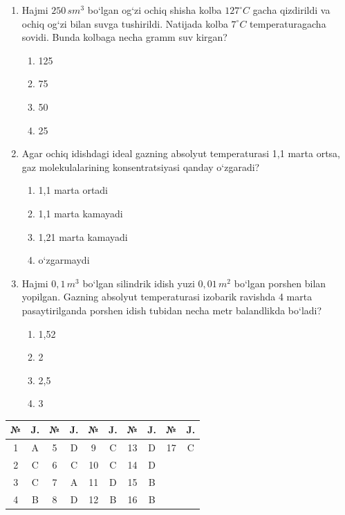 \begin{enumerate}
\item Hajmi $250 \, sm^3$ bo‘lgan og‘zi ochiq shisha kolba $127^\circ C$ gacha qizdirildi va ochiq og‘zi bilan suvga tushirildi. Natijada kolba $7^\circ C$ temperaturagacha sovidi. Bunda kolbaga necha gramm suv kirgan?
\begin{enumerate}[label=\Alph*)]
\item 125
\item 75
\item 50
\item 25
\end{enumerate}

\item Agar ochiq idishdagi ideal gazning absolyut temperaturasi 1,1 marta ortsa, gaz molekulalarining konsentratsiyasi qanday o‘zgaradi?
\begin{enumerate}[label=\Alph*)]
\item 1,1 marta ortadi
\item 1,1 marta kamayadi
\item 1,21 marta kamayadi
\item o‘zgarmaydi
\end{enumerate}

\item Hajmi $0,1 \, m^3$ bo‘lgan silindrik idish yuzi $0,01 \, m^2$ bo‘lgan porshen bilan yopilgan. Gazning absolyut temperaturasi izobarik ravishda 4 marta pasaytirilganda porshen idish tubidan necha metr balandlikda bo‘ladi?
\begin{enumerate}[label=\Alph*)]
\item 1,52
\item 2
\item 2,5
\item 3
\end{enumerate}

\end{enumerate}



\begin{table}[h!]
\centering
\begin{tabular}{|c|c|c|c|c|c|c|c|c|c|}
\hline
№ & J. & № & J. & № & J. & № & J. & № & J. \\ \hline
1 & A & 5 & D & 9 & C & 13 & D & 17 & C \\ \hline
2 & C & 6 & C & 10 & C & 14 & D & & \\ \hline
3 & C & 7 & A & 11 & D & 15 & B & & \\ \hline
4 & B & 8 & D & 12 & B & 16 & B & & \\ \hline
\end{tabular}
\end{table}